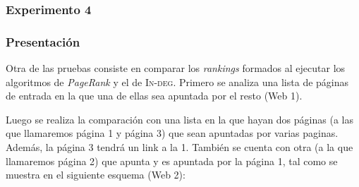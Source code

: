 	\subsubsection{Experimento 4}
		\subsubsection*{Presentación}
		Otra de las pruebas consiste en comparar los \emph{rankings} formados al ejecutar los algoritmos de \emph{PageRank} y el de \textsc{In-deg}. Primero se analiza una lista de páginas de entrada en la que una de ellas sea apuntada por el resto (Web 1). 

		Luego se realiza la comparación con una lista en la que hayan dos páginas (a las que llamaremos página 1 y página 3) que sean apuntadas por varias paginas. Además, la página 3 tendrá un link a la 1. También se cuenta con otra (a la que llamaremos página 2) que apunta y es apuntada por la página 1, tal como se muestra en el siguiente esquema (Web 2):

